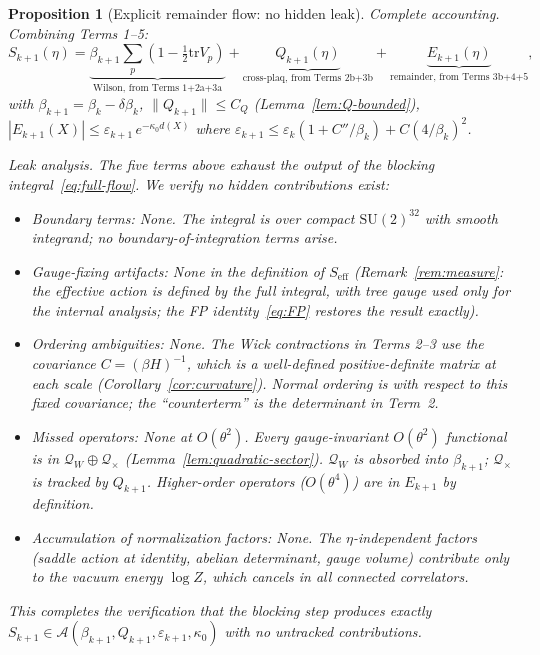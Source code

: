 \documentclass[11pt]{article}
\newtheorem{proposition}[theorem]{Proposition}
\theoremstyle{definition}
\newcommand{\SU}{\mathrm{SU}}
\newcommand{\tr}{\mathrm{tr}}
\begin{document}
\begin{proposition}[Explicit remainder flow: no hidden leak]
\emph{Complete accounting.}
Combining Terms 1--5:
\begin{equation}
S_{k+1}(\eta)
=\underbrace{\beta_{k+1}\sum_p(1-\tfrac{1}{2}\tr V_p)}
_{\text{Wilson, from Terms 1+2a+3a}}
+\underbrace{Q_{k+1}(\eta)}_{\text{cross-plaq, from Terms 2b+3b}}
+\underbrace{E_{k+1}(\eta)}_{\text{remainder, from Terms 3b+4+5}},
\end{equation}
with $\beta_{k+1}=\beta_k-\delta\beta_k$,
$\|Q_{k+1}\|\le C_Q$ (Lemma~\ref{lem:Q-bounded}),
$|E_{k+1}(X)|\le\varepsilon_{k+1}\,e^{-\kappa_0 d(X)}$
where $\varepsilon_{k+1}\le\varepsilon_k(1+C''/\beta_k)
+C(4/\beta_k)^2$.

\emph{Leak analysis.}
The five terms above exhaust the output of the blocking
integral~\eqref{eq:full-flow}.  We verify no hidden
contributions exist:
\begin{itemize}[nosep]
\item \emph{Boundary terms:} None.  The integral is over
compact $\SU(2)^{32}$ with smooth integrand; no
boundary-of-integration terms arise.
\item \emph{Gauge-fixing artifacts:}  None in the definition
of $S_{\mathrm{eff}}$
(Remark~\ref{rem:measure}: the effective action is defined
by the full integral, with tree gauge used only
for the internal analysis; the FP identity~\eqref{eq:FP}
restores the result exactly).
\item \emph{Ordering ambiguities:} None.  The Wick contractions
in Terms 2--3 use the covariance $C=(\beta H)^{-1}$, which
is a well-defined positive-definite matrix at each scale
(Corollary~\ref{cor:curvature}).
Normal ordering is with respect to this fixed covariance;
the ``counterterm'' is the determinant in Term~2.
\item \emph{Missed operators:} None at $O(\theta^2)$.
Every gauge-invariant $O(\theta^2)$ functional is in
$\mathcal{Q}_W\oplus\mathcal{Q}_\times$
(Lemma~\ref{lem:quadratic-sector}).  $\mathcal{Q}_W$ is
absorbed into $\beta_{k+1}$; $\mathcal{Q}_\times$ is tracked
by $Q_{k+1}$.  Higher-order operators ($O(\theta^4)$) are in
$E_{k+1}$ by definition.
\item \emph{Accumulation of normalization factors:} None.
The $\eta$-independent factors (saddle action at identity,
abelian determinant, gauge volume) contribute only to the
vacuum energy $\log Z$, which cancels in all connected
correlators.
\end{itemize}
This completes the verification that the blocking step
produces exactly $S_{k+1}\in\mathcal{A}(\beta_{k+1},Q_{k+1},
\varepsilon_{k+1},\kappa_0)$ with no untracked contributions.
\end{proposition}
\end{document}
